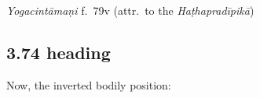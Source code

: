 \begin{ekdosis}
\begin{testimonia}[hp03_073]
\emph{Yogacintāmaṇi} f.~79v (attr.~to the \emph{Haṭhapradīpikā})
\begin{versinnote}
\end{versinnote}

\end{testimonia}





\subsection*{3.74 heading}
\begin{translation}[hp03_074a]
Now, the inverted bodily position:
\end{translation}


\end{ekdosis}

